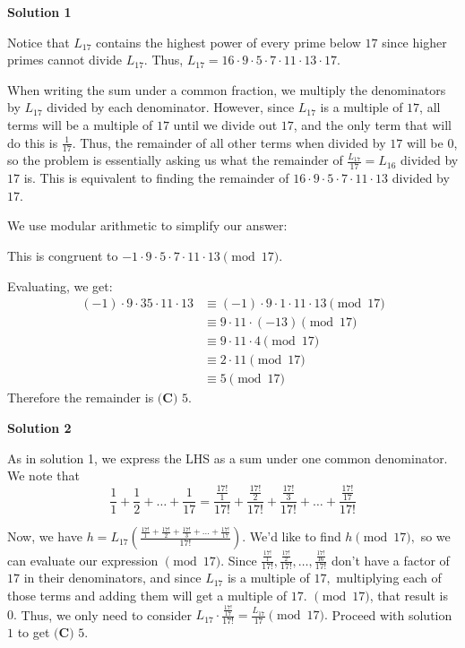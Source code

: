 \begin{enumerate}
\textbf{Solution 1}

Notice that $L_{17}$ contains the highest power of every prime below $17$ since higher primes cannot divide $L_{17}$. Thus, $L_{17}=16\cdot 9 \cdot 5 \cdot 7 \cdot 11 \cdot 13 \cdot 17$.

 When writing the sum under a common fraction, we multiply the denominators by $L_{17}$ divided by each denominator. However, since $L_{17}$ is a multiple of $17$, all terms will be a multiple of $17$ until we divide out $17$, and the only term that will do this is $\frac{1}{17}$. Thus, the remainder of all other terms when divided by $17$ will be $0$, so the problem is essentially asking us what the remainder of $\frac{L_{17}}{17} = L_{16}$ divided by $17$ is. This is equivalent to finding the remainder of $16 \cdot 9 \cdot 5 \cdot 7 \cdot 11 \cdot 13$ divided by $17$.

 We use modular arithmetic to simplify our answer:

 This is congruent to $-1 \cdot 9 \cdot 5 \cdot 7 \cdot 11 \cdot 13 \pmod{17}$.

 Evaluating, we get: 
 \begin{align*} (-1) \cdot 9 \cdot 35 \cdot 11 \cdot 13 &\equiv (-1) \cdot 9 \cdot 1 \cdot 11 \cdot 13 \pmod{17} \\ &\equiv 9 \cdot 11 \cdot (-13) \pmod{17} \\ &\equiv 9 \cdot 11 \cdot 4\pmod{17} \\ &\equiv 2 \cdot 11 \pmod{17} \\ &\equiv 5\pmod{17} \end{align*}
Therefore the remainder is $\boxed{\textbf{(C) } 5}$.

 



\textbf{Solution 2}

As in solution 1, we express the LHS as a sum under one common denominator. We note that 
 \[\frac{1}{1} + \frac{1}{2} + \dots + \frac{1}{17} = \frac{\frac{17!}{1}}{17!} + \frac{\frac{17!}{2}}{17!} + \frac{\frac{17!}{3}}{17!} + \dots + \frac{\frac{17!}{17}}{17!}\]

 Now, we have $h = L_{17}\left(\frac{\frac{17!}{1} + \frac{17!}{2} + \frac{17!}{3} + \dots + \frac{17!}{17}}{17!}\right)$. We'd like to find $h \pmod{17},$ so we can evaluate our expression $\pmod{17}.$ Since $\frac{\frac{17!}{1}}{17!}, \frac{\frac{17!}{2}}{17!}, \dots, \frac{\frac{17!}{16}}{17!}$ don't have a factor of $17$ in their denominators, and since $L_{17}$ is a multiple of $17,$ multiplying each of those terms and adding them will get a multiple of $17.$ $\pmod{17}$, that result is $0.$ Thus, we only need to consider $L_{17}\cdot \frac{\frac{17!}{17}}{17!} = \frac{L_{17}}{17} \pmod{17}.$ Proceed with solution $1$ to get $\boxed{\textbf{(C) }5}$.


\end{enumerate}

